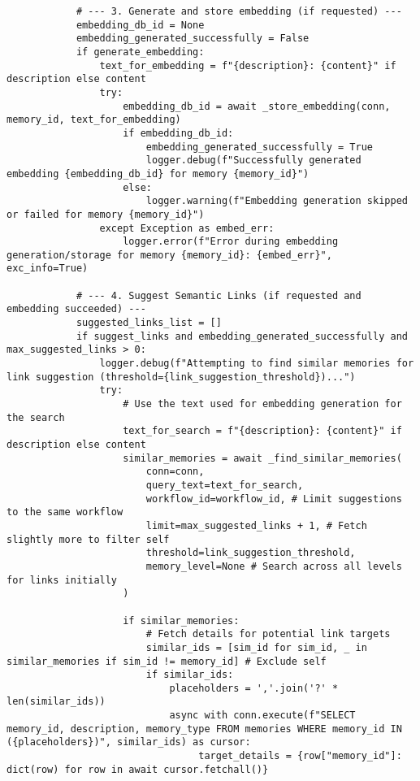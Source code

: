 \documentclass[12pt,a4paper]{article}
\begin{document}
\begin{pageablecode}
\begin{verbatim}
            # --- 3. Generate and store embedding (if requested) ---
            embedding_db_id = None
            embedding_generated_successfully = False
            if generate_embedding:
                text_for_embedding = f"{description}: {content}" if description else content
                try:
                    embedding_db_id = await _store_embedding(conn, memory_id, text_for_embedding)
                    if embedding_db_id:
                        embedding_generated_successfully = True
                        logger.debug(f"Successfully generated embedding {embedding_db_id} for memory {memory_id}")
                    else:
                        logger.warning(f"Embedding generation skipped or failed for memory {memory_id}")
                except Exception as embed_err:
                    logger.error(f"Error during embedding generation/storage for memory {memory_id}: {embed_err}", exc_info=True)

            # --- 4. Suggest Semantic Links (if requested and embedding succeeded) ---
            suggested_links_list = []
            if suggest_links and embedding_generated_successfully and max_suggested_links > 0:
                logger.debug(f"Attempting to find similar memories for link suggestion (threshold={link_suggestion_threshold})...")
                try:
                    # Use the text used for embedding generation for the search
                    text_for_search = f"{description}: {content}" if description else content
                    similar_memories = await _find_similar_memories(
                        conn=conn,
                        query_text=text_for_search,
                        workflow_id=workflow_id, # Limit suggestions to the same workflow
                        limit=max_suggested_links + 1, # Fetch slightly more to filter self
                        threshold=link_suggestion_threshold,
                        memory_level=None # Search across all levels for links initially
                    )

                    if similar_memories:
                        # Fetch details for potential link targets
                        similar_ids = [sim_id for sim_id, _ in similar_memories if sim_id != memory_id] # Exclude self
                        if similar_ids:
                            placeholders = ','.join('?' * len(similar_ids))
                            async with conn.execute(f"SELECT memory_id, description, memory_type FROM memories WHERE memory_id IN ({placeholders})", similar_ids) as cursor:
                                 target_details = {row["memory_id"]: dict(row) for row in await cursor.fetchall()}


\end{verbatim}
\end{pageablecode}
\end{document}
